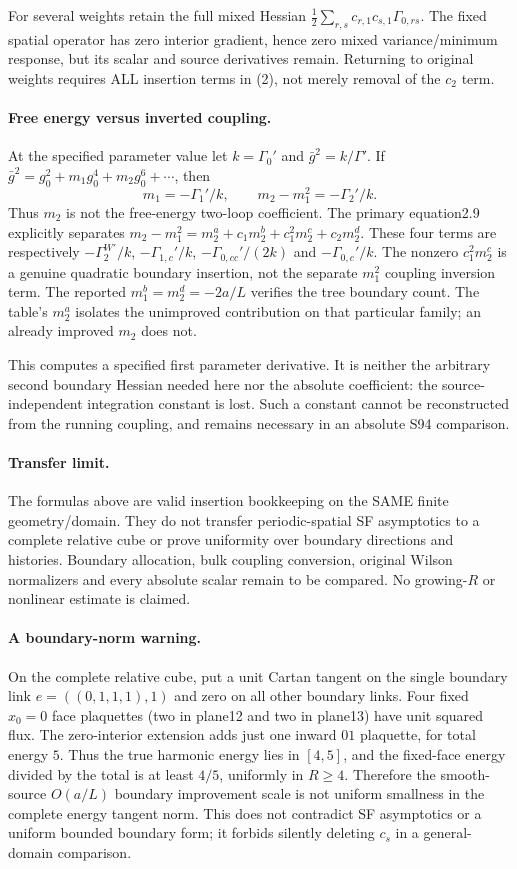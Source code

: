 \documentclass[11pt]{article}
\begin{document}
For several weights retain the full mixed Hessian
$\frac12\sum_{r,s}c_{r,1}c_{s,1}\Gamma_{0,rs}$.
The fixed spatial operator has zero interior gradient, hence zero
mixed variance/minimum response, but its scalar and source derivatives
remain. Returning to original weights requires ALL insertion terms
in (2), not merely removal of the $c_2$ term.

\paragraph{Free energy versus inverted coupling.}
At the specified parameter value let $k=\Gamma_0'$ and
$\bar g^2=k/\Gamma'$. If
$\bar g^2=g_0^2+m_1g_0^4+m_2g_0^6+\cdots$, then
\[
 m_1=-\Gamma_1'/k,\qquad
 \boxed{m_2-m_1^2=-\Gamma_2'/k.} \tag{4}
\]
Thus $m_2$ is not the free-energy two-loop coefficient. The primary
equation2.9 explicitly separates
$m_2-m_1^2=m_2^a+c_1m_2^b+c_1^2m_2^c+c_2m_2^d$.
These four terms are respectively
$-\Gamma_2^{W\prime}/k$, $-\Gamma_{1,c}'/k$,
$-\Gamma_{0,cc}'/(2k)$ and $-\Gamma_{0,c}'/k$.
The nonzero $c_1^2m_2^c$ is a genuine quadratic boundary insertion,
not the separate $m_1^2$ coupling inversion term.
The reported $m_1^b=m_2^d=-2a/L$ verifies the tree boundary count.
The table's $m_2^a$ isolates the unimproved contribution on that
particular family; an already improved $m_2$ does not.

This computes a specified first parameter derivative. It is neither
the arbitrary second boundary Hessian needed here nor the absolute
coefficient: the source-independent integration constant is lost.
Such a constant cannot be reconstructed from the running coupling,
and remains necessary in an absolute S94 comparison.

\paragraph{Transfer limit.}
The formulas above are valid insertion bookkeeping on the SAME
finite geometry/domain. They do not transfer periodic-spatial SF
asymptotics to a complete relative cube or prove uniformity over
boundary directions and histories. Boundary allocation, bulk coupling
conversion, original Wilson normalizers and every absolute scalar
remain to be compared. No growing-$R$ or nonlinear estimate is claimed.
\paragraph{A boundary-norm warning.}
On the complete
relative cube, put a unit Cartan tangent on the single boundary link
$e=((0,1,1,1),1)$ and zero on all other boundary links.
Four fixed $x_0=0$ face plaquettes (two in plane12 and two in plane13)
have unit squared flux. The zero-interior extension adds just one
inward $01$ plaquette, for total energy $5$. Thus the true harmonic energy
lies in $[4,5]$, and the fixed-face energy divided by the total is
at least $4/5$, uniformly in $R\ge4$.
Therefore the smooth-source $O(a/L)$ boundary improvement scale is
not uniform smallness in the complete energy tangent norm. This does
not contradict SF asymptotics or a uniform bounded boundary form;
it forbids silently deleting $c_s$ in a general-domain comparison.
\end{document}
